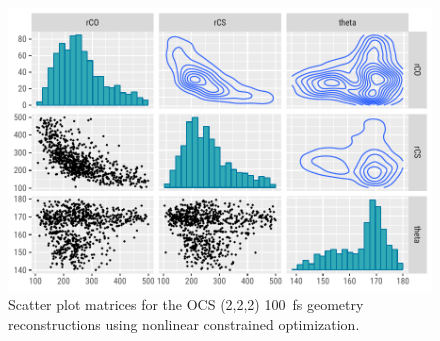 \begin{figure}
  \centering
  \includegraphics[width=\textwidth]{Plots/OCS222100fsMOGeometryPairs}
  \caption[Scatter plot matrices for the OCS (2,2,2) \SI{100}{\fs} geometry reconstructions using nonlinear constrained optimization.]
  {Scatter plot matrices for the OCS (2,2,2) \SI{100}{\fs} geometry reconstructions using nonlinear constrained optimization.}
  \label{fig:OCS222100fsMOGeometryPairs}
\end{figure}
